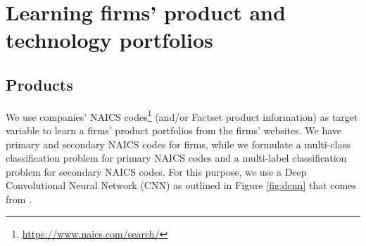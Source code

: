 \documentclass[12pt]{article}
\begin{document}
  



\section{Learning firms' product and technology portfolios}
\subsection{Products}
We use companies' NAICS codes\footnote{\href{https://www.naics.com/search/}{https://www.naics.com/search/}} (and/or Factset product information) as target variable to learn a firms' product portfolios from the firms' websites.
We have primary and secondary NAICS codes for firms, while we formulate a multi-class classification problem for primary NAICS codes and a multi-label classification problem for secondary NAICS codes. 
For this purpose, we use a Deep Convolutional Neural Network (CNN) as outlined in Figure \eqref{fig:dcnn} that comes from \cite{Kalchbrenner2014}.

\end{document}
